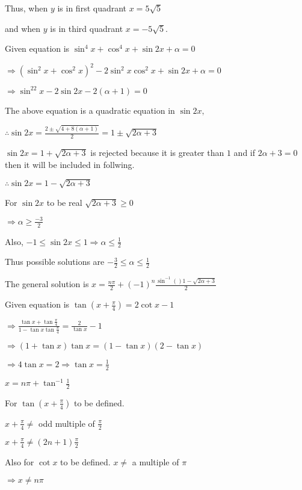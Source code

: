   Thus, when $y$ is in first quadrant $x = 5\sqrt{5}$

  and when $y$ is in third quadrant $x = -5\sqrt{5}.$

\item Given equation is $\sin^4x + \cos^4x + \sin2x + \alpha = 0$

  $\Rightarrow (\sin^2x + \cos^2x)^2 - 2\sin^2x\cos^2x + \sin2x + \alpha = 0$

  $\Rightarrow \sin^22x - 2\sin2x - 2(\alpha + 1) = 0$

  The above equation is a quadratic equation in $\sin2x,$

  $\therefore \sin2x = \frac{2\pm\sqrt{4 + 8(\alpha + 1)}}{2} = 1\pm \sqrt{2\alpha + 3}$

  $\sin2x = 1 + \sqrt{2\alpha + 3}$ is rejected because it is greater than $1$ and if $2\alpha + 3 = 0$ then
  it will be included in follwing.

  $\therefore \sin2x = 1 - \sqrt{2\alpha + 3}$

  For $\sin2x$ to be real $\sqrt{2\alpha + 3}\geq 0$

  $\Rightarrow \alpha \geq \frac{-3}{2}$

  Also, $-1\leq \sin2x\leq 1 \Rightarrow \alpha \leq \frac{1}{2}$

  Thus possible solutions are $-\frac{3}{2}\leq \alpha \leq \frac{1}{2}$

  The general solution is $x = \frac{n\pi}{2} + (-1)^n\frac{\sin^{-1}()1 - \sqrt{2\alpha + 3}}{2}$

\item Given equation is $\tan\left(x + \frac{\pi}{4}\right) = 2\cot x - 1$

  $\Rightarrow \frac{\tan x + \tan\frac{\pi}{4}}{1 - \tan x\tan\frac{\pi}{4}} = \frac{2}{\tan x} - 1$

  $\Rightarrow (1 + \tan x)\tan x = (1 - \tan x)(2 - \tan x)$

  $\Rightarrow 4\tan x = 2\Rightarrow \tan x = \frac{1}{2}$

  $x = n\pi + \tan^{-1}\frac{1}{2}$

  For $\tan\left(x + \frac{\pi}{4}\right)$ to be defined.

  $x + \frac{\pi}{4}\neq$ odd multiple of $\frac{\pi}{2}$

  $x + \frac{\pi}{4}\neq (2n + 1)\frac{\pi}{2}$

  Also for $\cot x$ to be defined. $x\neq$ a multiple of $\pi$

  $\Rightarrow x \neq n\pi$

